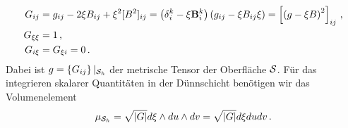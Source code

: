 \documentclass[a4paper,11pt]{scrartcl}
\newcommand{\surfh}{\surf_{h}}
\begin{document}
\begin{align}
  G_{ij} &= g_{ij} - 2\xi B_{ij} + \xi^{2}[B^{2}]_{ij} 
    = \left( \mathbf{\delta}{_{i}^{k}} - \xi\mathbf{B}{_{i}^{k}} \right) \left( g_{ij} - \xi B_{ij} \xi \right)
    = \left[ \left( g-\xi B \right)^{2} \right]_{ij}\,\text{,} \\
  G_{\xi\xi} &= 1 \,\text{,}\\
  G_{i\xi} &= G_{\xi i} = 0 \,\text{.}
\end{align}
Dabei ist \( g=\left\{ G_{ij} \right\}|_{\surfh} \) der metrische Tensor der Oberfläche \( \mathcal{S} \).
Für das integrieren skalarer Quantitäten in der Dünnschicht benötigen wir das Volumenelement
\begin{align}
  \mu_{\surfh} = \sqrt{|G|} d\xi \wedge du \wedge dv  = \sqrt{|G|} d\xi  du  dv\formPeriod
\end{align}
\end{document}
